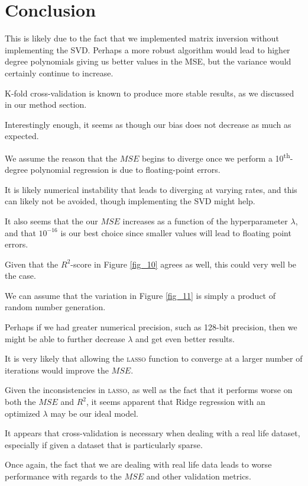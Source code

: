 \documentclass[a4paper,10pt,english]{article}
\begin{document}
\section*{Conclusion}

This is likely due to the fact that we implemented matrix inversion without implementing the SVD. Perhaps a more robust algorithm would lead to higher degree polynomials giving us better values in the MSE, but the variance would certainly continue to increase. 

K-fold cross-validation is known to produce more stable results, as we discussed in our method section.

Interestingly enough, it seems as though our bias does not decrease as much as expected. 

We assume the reason that the $MSE$ begins to diverge once we perform a 10\textsuperscript{th}-degree polynomial regression is due to floating-point errors.

It is likely numerical instability that leads to diverging at varying rates, and this can likely not be avoided, though implementing the SVD might help.

It also seems that the our $MSE$ increases as a function of the hyperparameter $\lambda$, and that $10^{-16}$ is our best choice since smaller values will lead to floating point errors.

Given that the $R^2$-score in Figure \ref{fig_10} agrees as well, this could very well be the case.

We can assume that the variation in Figure \ref{fig_11} is simply a product of random number generation.

Perhaps if we had greater numerical precision, such as 128-bit precision, then we might be able to further decrease $\lambda$ and get even better results.

It is very likely that allowing the \textsc{lasso} function to converge at a larger number of iterations would improve the $MSE$.

Given the inconsistencies in \textsc{lasso}, as well as the fact that it performs worse on both the $MSE$ and $R^2$, it seems apparent that Ridge regression with an optimized $\lambda$ may be our ideal model.

It appears that cross-validation is necessary when dealing with a real life dataset, especially if given a dataset that is particularly sparse.

Once again, the fact that we are dealing with real life data leads to worse performance with regards to the $MSE$ and other validation metrics.
\end{document}
